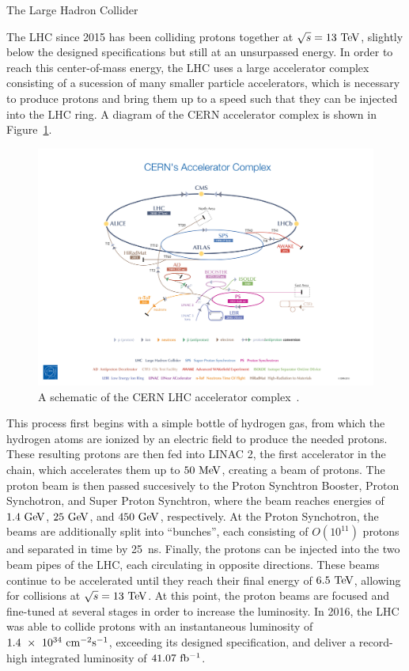 \begin{section}{The Large Hadron Collider}

The LHC since 2015 has been colliding protons together at $\sqrt{s} = 13~\mathrm{Te\kern -0.1em V}$, slightly below the designed specifications but still at an unsurpassed energy.
In order to reach this center-of-mass energy, the LHC uses a large accelerator complex consisting of a sucession of many smaller particle accelerators, which is necessary to produce protons and bring them up to a speed such that they can be injected into the LHC ring.
A diagram of the CERN accelerator complex is shown in Figure~\ref{fig:lhc_accelerator_complex}.

\begin{figure}[tbp!]
\begin{center}
\includegraphics[angle=0,width=0.95\columnwidth]{fig/lhc_accelerator_complex.jpg}
\end{center}
\caption{A schematic of the CERN LHC accelerator complex~\cite{Marcastel:1621583}.}
\label{fig:lhc_accelerator_complex}
\end{figure}

This process first begins with a simple bottle of hydrogen gas, from which the hydrogen atoms are ionized by an electric field to produce the needed protons.
These resulting protons are then fed into LINAC 2, the first accelerator in the chain, which accelerates them up to $50~\mathrm{Me\kern -0.1em V}$, creating a beam of protons.
The proton beam is then passed succesively to the Proton Synchtron Booster, Proton Synchotron, and Super Proton Synchtron, where the beam reaches energies of $1.4~\mathrm{Ge\kern -0.1em V}$, $25~\mathrm{Ge\kern -0.1em V}$, and $450~\mathrm{Ge\kern -0.1em V}$, respectively.
At the Proton Synchotron, the beams are additionally split into ``bunches'', each consisting of $O(10^{11})$ protons and separated in time by 25~ns. 
Finally, the protons can be injected into the two beam pipes of the LHC, each circulating in opposite directions. 
These beams continue to be accelerated until they reach their final energy of $6.5~\mathrm{Te\kern -0.1em V}$, allowing for collisions at $\sqrt{s} = 13~\mathrm{Te\kern -0.1em V}$.
At this point, the proton beams are focused and fine-tuned at several stages in order to increase the luminosity. 
In 2016, the LHC was able to collide protons with an instantaneous luminosity of $1.4~\times~10^{34}~\mathrm{cm}^{-2}\mathrm{s}^{-1}$, exceeding its designed specification, and deliver a record-high integrated luminosity of $41.07~\mathrm{fb^{-1}}$.


\end{section}
